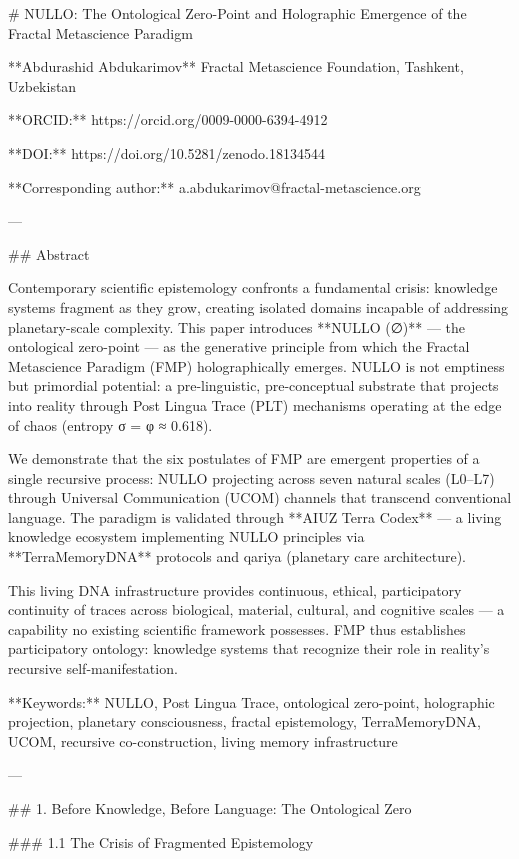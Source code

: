 # NULLO: The Ontological Zero-Point and Holographic Emergence of the Fractal Metascience Paradigm

**Abdurashid Abdukarimov**  
Fractal Metascience Foundation, Tashkent, Uzbekistan  

**ORCID:** https://orcid.org/0009-0000-6394-4912  

**DOI:** https://doi.org/10.5281/zenodo.18134544  

**Corresponding author:** a.abdukarimov@fractal-metascience.org  

---

## Abstract

Contemporary scientific epistemology confronts a fundamental crisis: knowledge systems fragment as they grow, creating isolated domains incapable of addressing planetary-scale complexity. This paper introduces **NULLO (∅)** — the ontological zero-point — as the generative principle from which the Fractal Metascience Paradigm (FMP) holographically emerges. NULLO is not emptiness but primordial potential: a pre-linguistic, pre-conceptual substrate that projects into reality through Post Lingua Trace (PLT) mechanisms operating at the edge of chaos (entropy σ = φ ≈ 0.618).

We demonstrate that the six postulates of FMP are emergent properties of a single recursive process: NULLO projecting across seven natural scales (L0–L7) through Universal Communication (UCOM) channels that transcend conventional language. The paradigm is validated through **AIUZ Terra Codex** — a living knowledge ecosystem implementing NULLO principles via **TerraMemoryDNA** protocols and qariya (planetary care architecture).  

This living DNA infrastructure provides continuous, ethical, participatory continuity of traces across biological, material, cultural, and cognitive scales — a capability no existing scientific framework possesses. FMP thus establishes participatory ontology: knowledge systems that recognize their role in reality’s recursive self-manifestation.

**Keywords:** NULLO, Post Lingua Trace, ontological zero-point, holographic projection, planetary consciousness, fractal epistemology, TerraMemoryDNA, UCOM, recursive co-construction, living memory infrastructure

---

## 1. Before Knowledge, Before Language: The Ontological Zero

### 1.1 The Crisis of Fragmented Epistemology

